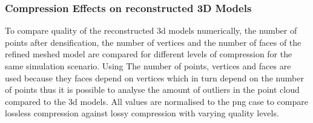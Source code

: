 \subsubsection{Compression Effects on reconstructed 3D Models}
To compare  quality of the reconstructed \gls{3d} models numerically, the number of points after densification, the number of vertices and the number of faces of the refined meshed model are compared for different levels of compression for the same simulation scenario. Using The number of points, vertices and faces are used because they faces depend on vertices which in turn depend on the number of points thus it is possible to analyse the amount of outliers in the point cloud compared to the \gls{3d} models. All values are normalised to the \gls{png} case to compare lossless compression against lossy compression with varying quality levels.

